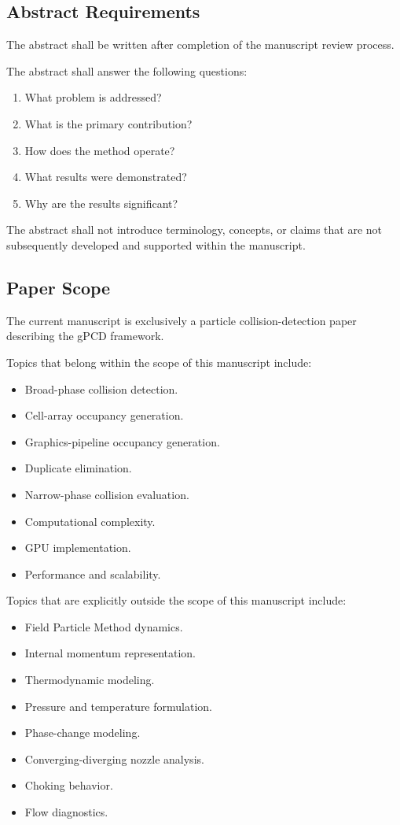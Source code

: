 \subsection{Abstract Requirements}

The abstract shall be written after completion of the manuscript
review process.

The abstract shall answer the following questions:

\begin{enumerate}
\item What problem is addressed?
\item What is the primary contribution?
\item How does the method operate?
\item What results were demonstrated?
\item Why are the results significant?
\end{enumerate}

The abstract shall not introduce terminology, concepts, or claims
that are not subsequently developed and supported within the manuscript.

\subsection{Paper Scope}

The current manuscript is exclusively a particle collision-detection
paper describing the gPCD framework.

Topics that belong within the scope of this manuscript include:

\begin{itemize}
\item Broad-phase collision detection.
\item Cell-array occupancy generation.
\item Graphics-pipeline occupancy generation.
\item Duplicate elimination.
\item Narrow-phase collision evaluation.
\item Computational complexity.
\item GPU implementation.
\item Performance and scalability.
\end{itemize}

Topics that are explicitly outside the scope of this manuscript include:

\begin{itemize}
\item Field Particle Method dynamics.
\item Internal momentum representation.
\item Thermodynamic modeling.
\item Pressure and temperature formulation.
\item Phase-change modeling.
\item Converging-diverging nozzle analysis.
\item Choking behavior.
\item Flow diagnostics.
\end{itemize}

